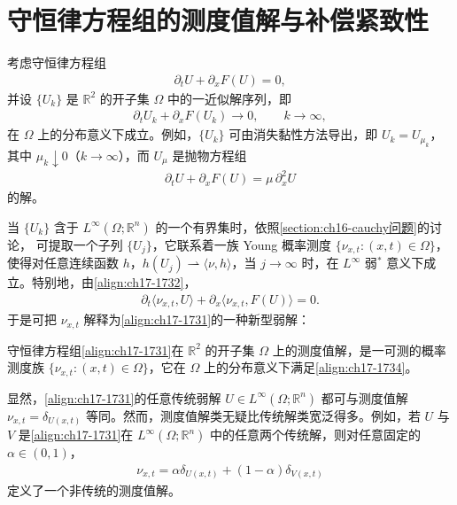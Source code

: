\documentclass[../../main.tex]{subfiles}
\begin{document}
\section{守恒律方程组的测度值解与补偿紧致性}\label{section:ch17-测度值解与补偿紧致}

考虑守恒律方程组
\begin{align}
\partial_t U+\partial_x F(U)=0,
\label{align:ch17-1731}
\end{align}
并设 $\{U_k\}$ 是 $\mathbb{R}^2$ 的开子集 $\Omega$ 中的一近似解序列，即
\begin{align}
\partial_t U_k+\partial_x F(U_k)\longrightarrow 0,\qquad k\to\infty,
\label{align:ch17-1732}
\end{align}
在 $\Omega$ 上的分布意义下成立。例如，$\{U_k\}$ 可由消失黏性方法导出，即 $U_k=U_{\mu_k}$，其中 $\mu_k\downarrow0$（$k\to\infty$），而 $U_\mu$ 是抛物方程组
\begin{align}
\partial_t U+\partial_x F(U)=\mu\,\partial_x^2U
\label{align:ch17-1733}
\end{align}
的解。

当 $\{U_k\}$ 含于 $L^\infty(\Omega;\mathbb{R}^n)$ 的一个有界集时，依照\cref{section:ch16-cauchy问题}的讨论，
可提取一个子列 $\{U_j\}$，它联系着一族 Young 概率测度 $\{\nu_{x,t}:(x,t)\in\Omega\}$，使得对任意连续函数 $h$，$h(U_j)\rightharpoonup\langle\nu,h\rangle$，当 $j\to\infty$ 时，在 $L^\infty$ 弱$^*$ 意义下成立。特别地，由\eqref{align:ch17-1732}，
\begin{align}
\partial_t\langle\nu_{x,t},U\rangle+\partial_x\langle\nu_{x,t},F(U)\rangle=0.
\label{align:ch17-1734}
\end{align}
于是可把 $\nu_{x,t}$ 解释为\eqref{align:ch17-1731}的一种新型弱解：

\begin{definition}[测度值解]\label{definition:ch17-测度值解}
守恒律方程组\eqref{align:ch17-1731}在 $\mathbb{R}^2$ 的开子集 $\Omega$ 上的测度值解，是一可测的概率测度族 $\{\nu_{x,t}:(x,t)\in\Omega\}$，它在 $\Omega$ 上的分布意义下满足\eqref{align:ch17-1734}。
\end{definition}

显然，\eqref{align:ch17-1731}的任意传统弱解 $U\in L^\infty(\Omega;\mathbb{R}^n)$ 都可与测度值解 $\nu_{x,t}=\delta_{U(x,t)}$ 等同。然而，测度值解类无疑比传统解类宽泛得多。例如，若 $U$ 与 $V$ 是\eqref{align:ch17-1731}在 $L^\infty(\Omega;\mathbb{R}^n)$ 中的任意两个传统解，则对任意固定的 $\alpha\in(0,1)$，
\begin{align}
\nu_{x,t}=\alpha\delta_{U(x,t)}+(1-\alpha)\delta_{V(x,t)}
\label{align:ch17-1735}
\end{align}
定义了一个非传统的测度值解。
\end{document}
